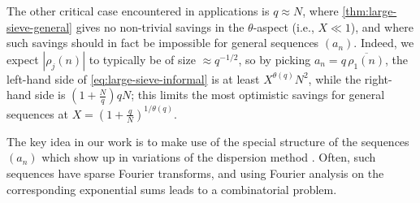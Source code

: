 \documentclass[reqno,11pt]{amsart}
\theoremstyle{remark}
\numberwithin{equation}{section}
\renewcommand{\bar}{\overline}
\begin{document}
The other critical case encountered in applications is $q \approx N$, where \cref{thm:large-sieve-general} gives no non-trivial savings in the $\theta$-aspect (i.e., $X \ll 1$), and where such savings should in fact be impossible for general sequences $(a_n)$. Indeed, we expect $|\rho_j(n)|$ to typically be of size $\approx q^{-1/2}$, so by picking $a_n = q\, \bar{\rho_1(n)}$, the left-hand side of \cref{eq:large-sieve-informal} is at least $X^{\theta(q)} N^2$, while the right-hand side is $(1 + \frac{N}{q}) qN$; this limits the most optimistic savings for general sequences at $X = (1 + \frac{q}{N})^{1/\theta(q)}$.

The key idea in our work is to make use of the special structure of the sequences $(a_n)$ which show up in variations of the dispersion method \cite{linnik1963dispersion}. Often, such sequences have sparse Fourier transforms, and using Fourier analysis on the corresponding exponential sums leads to a combinatorial problem.
\end{document}
